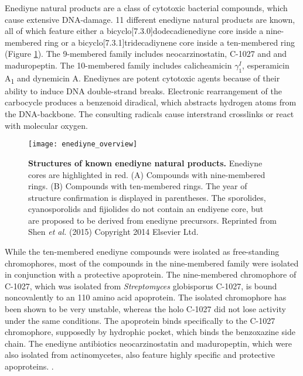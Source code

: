 	 Enediyne natural products are a class of cytotoxic bacterial compounds, which cause extensive DNA-damage.\autocite{Liang2010,Gredicak2007,AdrianL.Smith*1996,Nicolaou1993} 11 different enediyne natural products are known, all of which feature either a bicyclo[7.3.0]dodecadienediyne core inside a nine-membered ring or a bicyclo[7.3.1]tridecadiynene core inside a ten-membered ring (Figure \ref{fig:enediyne_comparison}). The 9-membered family includes neocarzinostatin, C-1027 and and maduropeptin. The 10-membered family includes calicheamicin $\gamma_{1}^{I}$, esperamicin A\textsubscript{1} and dynemicin A. \autocite{Liang2010} Enediynes are potent cytotoxic agents because of their ability to induce DNA double-strand breaks.\autocite{Shen2015} Electronic rearrangement of the carbocycle produces a benzenoid diradical, which abstracts hydrogen atoms from the DNA-backbone. The consulting radicals cause interstrand crosslinks or react with molecular oxygen.	 
	 \begin{figure}[htbp]
	 	\label{fig:enediyne_comparison}
	 	\centering
	 	\texttt{[image: enediyne\_overview]}
	 	\caption[Structures of known enediyne natural products]{\textbf{Structures of known enediyne natural products.} Enediyne cores are highlighted in red. (A) Compounds with nine-membered rings. (B) Compounds with ten-membered rings. The year of structure confirmation is displayed in parentheses. The sporolides, cyanosporolids and fijiolides do not contain an endiyene core, but are proposed to be derived from enediyne precursors. Reprinted from Shen \textit{et al.} (2015) Copyright 2014 Elsevier Ltd.}
	 \end{figure}
	 While the ten-membered enediyne compounds were isolated as free-standing chromophores, most of the compounds in the nine-membered family were isolated in conjunction with a protective apoprotein.\autocite{Liang2010} The nine-membered chromophore of C-1027, which was isolated from \textit{Streptomyces} globisporus C-1027, is bound noncovalently to an 110 amino acid apoprotein.\autocite{AdrianL.Smith*1996,Minami1993,Yoshida1993,Otani1993,Sugiura1993,Matsumoto1993,Otani1991,Otani1988a,Matsumoto1993a} The isolated chromophore has been shown to be very unstable, whereas the holo C-1027 did not lose activity under the same conditions. \autocite{Matsumoto1993,Sugiura1993,Otani1991} The apoprotein binds specifically to the C-1027 chromophore, supposedly by hydrophic pocket, which binds the benzoxazine side chain. \autocite{Okuno1994,Matsumoto1993} The enediyne antibiotics neocarzinostatin and maduropeptin, which were also isolated from actinomycetes, also feature highly specific and protective apoproteins. \autocite{AdrianL.Smith*1996}.
	 

